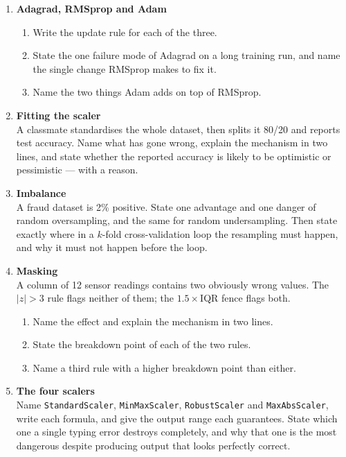 \documentclass[11pt,a4paper]{article}
\begin{document}
\begin{enumerate}[label=\textbf{A\arabic*.}, leftmargin=*]
  \item \textbf{Adagrad, RMSprop and Adam} \\
    \begin{enumerate}[label=(\alph*), leftmargin=*]
      \item Write the update rule for each of the three.
      \item State the one failure mode of Adagrad on a long training run, and
        name the single change RMSprop makes to fix it.
      \item Name the two things Adam adds on top of RMSprop.
    \end{enumerate}

  \item \textbf{Fitting the scaler} \\
    A classmate standardises the whole dataset, then splits it 80/20 and
    reports test accuracy. Name what has gone wrong, explain the mechanism in
    two lines, and state whether the reported accuracy is likely to be
    optimistic or pessimistic --- with a reason.

  \item \textbf{Imbalance} \\
    A fraud dataset is 2\% positive. State one advantage and one danger of
    random oversampling, and the same for random undersampling. Then state
    exactly where in a $k$-fold cross-validation loop the resampling must
    happen, and why it must not happen before the loop.

  \item \textbf{Masking} \\
    A column of 12 sensor readings contains two obviously wrong values. The
    $|z| > 3$ rule flags neither of them; the $1.5\times$IQR fence flags both.
    \begin{enumerate}[label=(\alph*), leftmargin=*]
      \item Name the effect and explain the mechanism in two lines.
      \item State the breakdown point of each of the two rules.
      \item Name a third rule with a higher breakdown point than either.
    \end{enumerate}

  \item \textbf{The four scalers} \\
    Name \texttt{StandardScaler}, \texttt{MinMaxScaler}, \texttt{RobustScaler}
    and \texttt{MaxAbsScaler}, write each formula, and give the output range
    each guarantees. State which one a single typing error destroys completely,
    and why that one is the most dangerous despite producing output that looks
    perfectly correct.


\end{enumerate}
\end{document}
